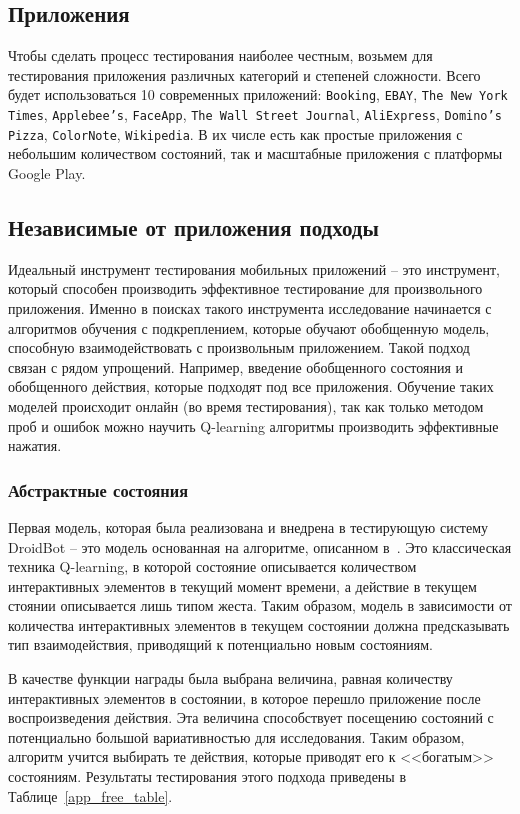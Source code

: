 \subsection{Приложения}

Чтобы сделать процесс тестирования наиболее честным, возьмем для тестирования приложения различных категорий и степеней сложности. Всего будет использоваться 10 современных приложений: \texttt{Booking}, \texttt{EBAY}, \texttt{The New York Times}, \texttt{Applebee's}, \texttt{FaceApp}, \texttt{The Wall Street Journal}, \texttt{AliExpress}, \texttt{Domino's Pizza}, \texttt{ColorNote}, \texttt{Wikipedia}. В их числе есть как простые приложения с небольшим количеством состояний, так и масштабные приложения с платформы Google Play.

\subsection{Независимые от приложения подходы}

Идеальный инструмент тестирования мобильных приложений -- это инструмент, который способен производить эффективное тестирование для произвольного приложения. Именно в поисках такого инструмента исследование начинается с алгоритмов обучения с подкреплением, которые обучают обобщенную модель, способную взаимодействовать с произвольным приложением. Такой подход связан с рядом упрощений. Например, введение обобщенного состояния и обобщенного действия, которые подходят под все приложения. Обучение таких моделей происходит онлайн (во время тестирования), так как только методом проб и ошибок можно научить Q-learning алгоритмы производить эффективные нажатия.

\subsubsection{Абстрактные состояния}

Первая модель, которая была реализована и внедрена в тестирующую систему DroidBot -- это модель основанная на алгоритме, описанном в~\cite{koroglu2018qbe}. Это классическая техника Q-learning, в которой состояние описывается количеством интерактивных элементов в текущий момент времени, а действие в текущем стоянии описывается лишь типом жеста. Таким образом, модель в зависимости от количества интерактивных элементов в текущем состоянии должна предсказывать тип взаимодействия, приводящий к потенциально новым состояниям.

В качестве функции награды была выбрана величина, равная количеству интерактивных элементов в состоянии, в которое перешло приложение после воспроизведения действия. Эта величина способствует посещению состояний с потенциально большой вариативностью для исследования. Таким образом, алгоритм учится выбирать те действия, которые приводят его к <<богатым>> состояниям. Результаты тестирования этого подхода приведены в Таблице~\ref{app_free_table}.

